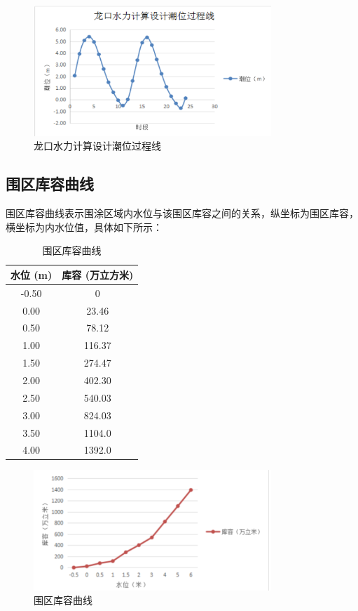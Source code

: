 \documentclass[UTF8, a4paper, 12pt]{ctexart} %
\begin{document}
\begin{figure}[h]
    \centering
    \includegraphics[width=0.8\textwidth]{figurenb.png}
    \caption{龙口水力计算设计潮位过程线}
    \label{fig:dragon_port_tide_process}
\end{figure}

\subsection{围区库容曲线}

围区库容曲线表示围涂区域内水位与该围区库容之间的关系，纵坐标为围区库容，
横坐标为内水位值，具体如下所示：

\begin{table}[h]
    \centering
    \caption{围区库容曲线}
    \begin{tabular}{|c|c|}
        \hline
        \textbf{水位 (m)} & \textbf{库容 (万立方米)} \\ \hline
        -0.50 & 0 \\ \hline
        0.00 & 23.46 \\ \hline
        0.50 & 78.12 \\ \hline
        1.00 & 116.37 \\ \hline
        1.50 & 274.47 \\ \hline
        2.00 & 402.30 \\ \hline
        2.50 & 540.03 \\ \hline
        3.00 & 824.03 \\ \hline
        3.50 & 1104.0 \\ \hline
        4.00 & 1392.0 \\ \hline
    \end{tabular}
    \label{tab:storage_capacity_curve}
\end{table}


\begin{figure}
    \centering
    \includegraphics[width=0.8\textwidth]{figurenb2.png}
    \caption{围区库容曲线}
    \label{fig:storage_capacity_curve}
\end{figure}
\end{document}
